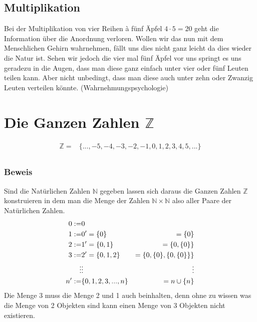 \documentclass[a4paper]{scrartcl}
\begin{document}
\subsection{Multiplikation}
Bei der Multiplikation von vier Reihen à fünf Äpfel $ 4 \cdot 5 = 20 $ geht die Information über die Anordnung verloren. Wollen wir das nun mit dem Menschlichen Gehirn wahrnehmen, fällt uns dies nicht ganz leicht da dies wieder die Natur ist. Sehen wir jedoch die vier mal fünf Äpfel vor uns springt es uns geradezu in die Augen, dass man diese ganz einfach unter vier oder fünf Leuten teilen kann. Aber nicht unbedingt, dass man diese auch unter zehn oder Zwanzig Leuten verteilen könnte. (Wahrnehmungspsychologie)

\section{Die Ganzen Zahlen $\mathbb{Z}$}
\begin{eqnarray}
\mathbb{Z} = & \{ ..., -5, -4, -3, -2, -1, 0, 1 , 2 , 3 , 4 , 5, ... \}  \\
\end{eqnarray}

\subsubsection{Beweis}
Sind die Natürlichen Zahlen $\mathbb{N}$ gegeben lassen sich daraus die Ganzen Zahlen $\mathbb{Z}$ konstruieren in dem man die Menge der Zahlen $\mathbb{N} \times \mathbb{N}$ also aller Paare der Natürlichen Zahlen. 
\begin{align}
0:=&0 \\
1:=&0'=\{0\}&=\{0\} \\
2:=&1'=\{0,1\}&=\{0,\{0\}\} \\
3:=&2'=\{0,1,2\}&=\{0,\{0\},\{0,\{0\}\}\} \\
\vdots& \vdots& \vdots \notag \\
n':=&\{0,1,2,3,...,n\}&=n\cup\{n\}
\end{align}
Die Menge 3 muss die Menge 2 und 1 auch beinhalten, denn ohne zu wissen was die Menge von 2 Objekten sind kann einen Menge von 3 Objekten nicht existieren. \\
\end{document}

